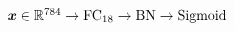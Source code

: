 $\vect{x} \in \real^{784} \newline
	\rightarrow \text{FC}_{18} \rightarrow \text{BN} \rightarrow \text{Sigmoid} \newline$